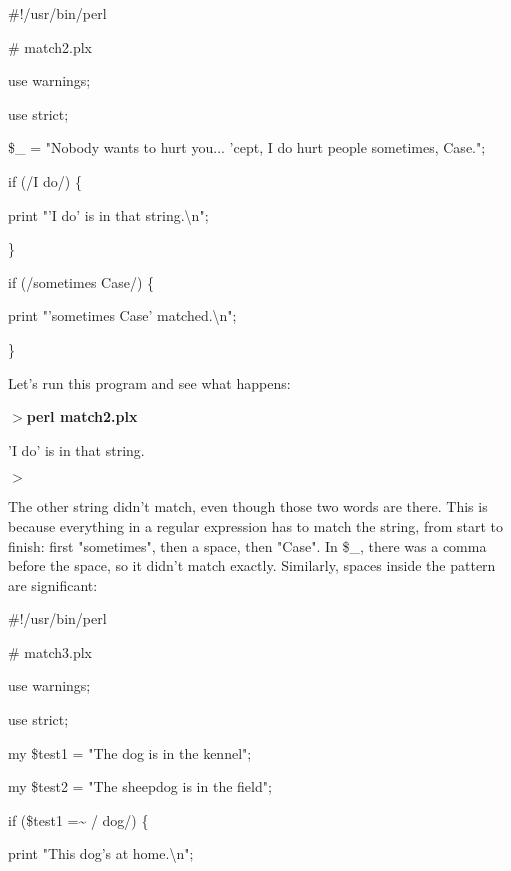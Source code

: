 \documentclass[a4paper,11pt]{book}
\begin{document}
\noindent \#!/usr/bin/perl

\noindent \# match2.plx

\noindent use warnings;

\noindent use strict;

\noindent 

\noindent \$\_  = "Nobody wants to hurt you... 'cept, I do hurt people sometimes, Case.";

\noindent 

\noindent if (/I do/) \{

\noindent print "'I do' is in that string.\textbackslash n";

\noindent \}

\noindent 

\noindent if (/sometimes Case/) \{

\noindent print "'sometimes Case' matched.\textbackslash n";

\noindent \}

\noindent 

\noindent Let's run this program and see what happens:

\noindent 

\noindent $>$\textbf{perl match2.plx}

\noindent 'I do' is in that string.

\noindent $>$

\noindent 

\noindent The other string didn't match, even though those two words are there. This is because everything in a regular expression has to match the string, from start to finish: first "sometimes", then a space, then "Case". In \$\_, there was a comma before the space, so it didn't match exactly. Similarly, spaces inside the pattern are significant:

\noindent 

\noindent \#!/usr/bin/perl

\noindent \# match3.plx

\noindent use warnings;

\noindent use strict;

\noindent 

\noindent my \$test1 = "The dog is in the kennel";

\noindent my \$test2 = "The sheepdog is in the field";

\noindent 

\noindent if (\$test1 =\~{} / dog/) \{

\noindent print "This dog's at home.\textbackslash n";
\end{document}
